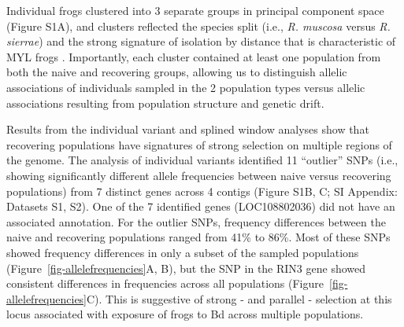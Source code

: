 \documentclass[9pt,twocolumn,twoside,lineno]{pnas-new}
\begin{document}
Individual frogs clustered into 3 separate groups in principal component
space (Figure S1A), and clusters reflected the
species split (i.e., \emph{R. muscosa} versus \emph{R. sierrae}) and the
strong signature of isolation by distance that is characteristic of MYL
frogs \citep{rothstein2020, poorten2017}. Importantly, each cluster
contained at least one population from both the naive and recovering
groups, allowing us to distinguish allelic associations of individuals
sampled in the 2 population types versus allelic associations resulting
from population structure and genetic drift.

Results from the individual variant and splined window analyses show
that recovering populations have signatures of strong selection on
multiple regions of the genome. The analysis of individual variants
identified 11 ``outlier'' SNPs (i.e., showing significantly different
allele frequencies between naive versus recovering populations) from 7
distinct genes across 4 contigs (Figure S1B, C;
SI Appendix: Datasets S1, S2). One of the 7 identified genes
(LOC108802036) did not have an associated annotation. For the outlier
SNPs, frequency differences between the naive and recovering populations
ranged from 41\% to 86\%. Most of these SNPs showed frequency
differences in only a subset of the sampled populations
(Figure~\ref{fig-allelefrequencies}A, B), but the SNP in the RIN3 gene
showed consistent differences in frequencies across all populations
(Figure~\ref{fig-allelefrequencies}C). This is suggestive of strong -
and parallel - selection at this locus associated with exposure of frogs
to Bd across multiple populations.
\end{document}
